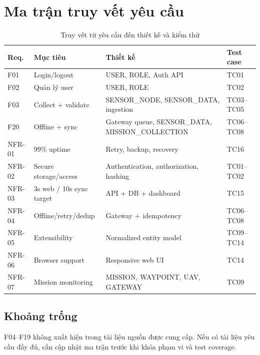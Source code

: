 \chapter{Ma trận truy vết yêu cầu}

\begin{table}[H]
\centering
\caption{Truy vết từ yêu cầu đến thiết kế và kiểm thử}
\begin{tabularx}{\textwidth}{p{1.7cm}X X p{2.5cm}}
\toprule
Req. & Mục tiêu & Thiết kế & Test case\\
\midrule
F01 & Login/logout & USER, ROLE, Auth API & TC01\\
F02 & Quản lý user & USER, ROLE & TC02\\
F03 & Collect + validate & SENSOR\_NODE, SENSOR\_DATA, ingestion & TC03--TC05\\
F20 & Offline + sync & Gateway queue, SENSOR\_DATA, MISSION\_COLLECTION & TC06--TC08\\
NFR-01 & 99\% uptime & Retry, backup, recovery & TC16\\
NFR-02 & Secure storage/access & Authentication, authorization, hashing & TC01--TC02\\
NFR-03 & 3s web / 10s sync target & API + DB + dashboard & TC15\\
NFR-04 & Offline/retry/dedup & Gateway + idempotency & TC06--TC08\\
NFR-05 & Extensibility & Normalized entity model & TC09--TC14\\
NFR-06 & Browser support & Responsive web UI & TC14\\
NFR-07 & Mission monitoring & MISSION, WAYPOINT, UAV, GATEWAY & TC09\\
\bottomrule
\end{tabularx}
\end{table}

\section{Khoảng trống}
F04--F19 không xuất hiện trong tài liệu nguồn được cung cấp. Nếu có tài liệu yêu cầu đầy đủ, cần cập nhật ma trận trước khi khóa phạm vi và test coverage.
